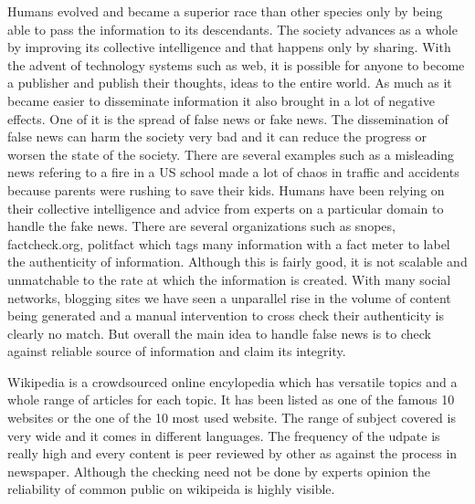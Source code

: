 \documentclass[a4paper, 11pt]{article}
\begin{document}



Humans evolved and became a superior race than other species only by being able to pass the information to its descendants. The society advances as a whole by improving its collective intelligence and that happens only by sharing. With the advent of technology systems such as web, it is possible for anyone to become a publisher and publish their thoughts, ideas to the entire world. As much as it became easier to disseminate information it also brought in a lot of negative effects. One of it is the spread of false news or fake news. The dissemination of false news can harm the society very bad and it can reduce the progress or worsen the state of the society. There are several examples such as a misleading news refering to a fire in a US school made a lot of chaos in traffic and accidents because parents were rushing to save their kids. Humans have been relying on their collective intelligence and advice from experts on a particular domain to handle the fake news. There are several organizations such as snopes, factcheck.org, politfact which tags many information with a fact meter to label the authenticity of information. Although this is fairly good, it is not scalable and unmatchable to the rate at which the information is created. With many social networks, blogging sites we have seen a unparallel rise in the volume of content being generated and a manual intervention to cross check their authenticity is clearly no match. But overall the main idea to handle false news is to check against reliable source of information and claim its integrity.

Wikipedia is a crowdsourced online encylopedia which has versatile topics and a whole range of articles for each topic. It has been listed as one of the famous 10 websites or the one of the 10 most used website. The range of subject covered is very wide and it comes in different languages. The frequency of the udpate is really high and every content is peer reviewed by other as against the process in newspaper. Although the checking need not be done by experts opinion the reliability of common public on wikipeida is highly visible. 
\end{document}
